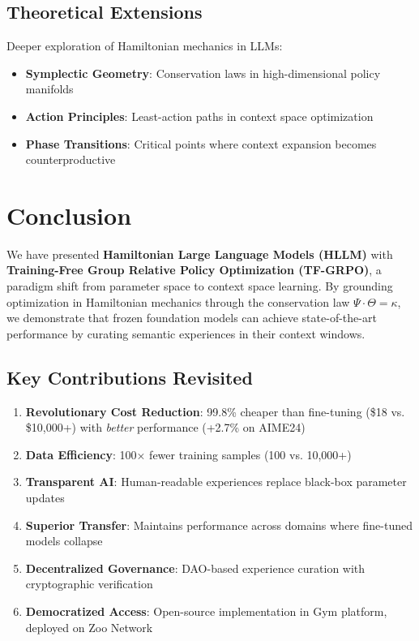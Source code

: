 \documentclass[11pt,a4paper]{article}
\begin{document}
\subsection{Theoretical Extensions}

Deeper exploration of Hamiltonian mechanics in LLMs:

\begin{itemize}
    \item \textbf{Symplectic Geometry}: Conservation laws in high-dimensional policy manifolds
    \item \textbf{Action Principles}: Least-action paths in context space optimization
    \item \textbf{Phase Transitions}: Critical points where context expansion becomes counterproductive
\end{itemize}

\section{Conclusion}

We have presented \textbf{Hamiltonian Large Language Models (HLLM)} with \textbf{Training-Free Group Relative Policy Optimization (TF-GRPO)}, a paradigm shift from parameter space to context space learning. By grounding optimization in Hamiltonian mechanics through the conservation law $\Psi \cdot \Theta = \kappa$, we demonstrate that frozen foundation models can achieve state-of-the-art performance by curating semantic experiences in their context windows.

\subsection{Key Contributions Revisited}

\begin{enumerate}
    \item \textbf{Revolutionary Cost Reduction}: 99.8\% cheaper than fine-tuning (\$18 vs. \$10,000+) with \textit{better} performance (+2.7\% on AIME24)

    \item \textbf{Data Efficiency}: 100× fewer training samples (100 vs. 10,000+)

    \item \textbf{Transparent AI}: Human-readable experiences replace black-box parameter updates

    \item \textbf{Superior Transfer}: Maintains performance across domains where fine-tuned models collapse

    \item \textbf{Decentralized Governance}: DAO-based experience curation with cryptographic verification

    \item \textbf{Democratized Access}: Open-source implementation in Gym platform, deployed on Zoo Network
\end{enumerate}
\end{document}

